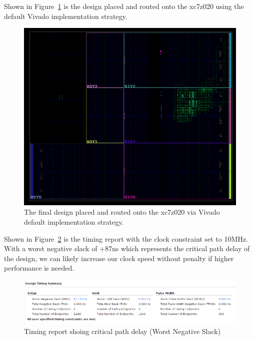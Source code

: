 \documentclass{article}
\begin{document}
    Shown in Figure~\ref{fig:device} is the design placed and routed onto the xc7z020 using the default Vivado implementation strategy.
    \begin{figure}
        \centering
        \includegraphics[width=1.25\textwidth]{figures/device.png}
        \caption{
            The final design placed and routed onto the xc7z020 via Vivado default implementation strategy.
        }
        \label{fig:device}
    \end{figure}
    Shown in Figure~\ref{fig:timing} is the timing report with the clock constraint set to 10MHz.
    With a worst negative slack of +87ns which represents the critical path delay of the design,
    we can likely increase our clock speed without penalty if higher performance is needed.
    \begin{figure}
        \centering
        \includegraphics[width=1.25\textwidth]{figures/timing.png}
        \caption{
            Timing report shoing critical path delay (Worst Negative Slack)
        }
        \label{fig:timing}
    \end{figure}
\end{document}
